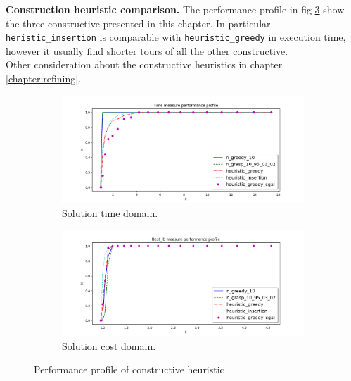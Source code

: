 \textbf{Construction heuristic comparison.} The performance profile in fig \ref{fig:pp_Lconstructives} show the three constructive presented in this chapter. In particular \texttt{heristic\_insertion} is comparable with \texttt{heuristic\_greedy} in execution time, however it usually find shorter tours of all the other constructive.\\
Other consideration about the constructive heuristics in chapter \ref{chapter:refining}.

\begin{figure}[!h]
	\centering
	\begin{subfigure}{.9\textwidth}
		\centering
		\includegraphics[width=\columnwidth]{../res/Lconstructives_LA_time.png}
		\caption{Solution time domain.}
		\label{fig:Lconstructives_time}
	\end{subfigure}
	\begin{subfigure}{.9\textwidth}
	\centering
	\includegraphics[width=\columnwidth]{../res/Lconstructives_LA_lb.png}
	\caption{Solution cost domain.}
	\label{fig:Lconstructives_lb}
	\end{subfigure}
	\caption{Performance profile of constructive heuristic}
	\label{fig:pp_Lconstructives}
\end{figure}
